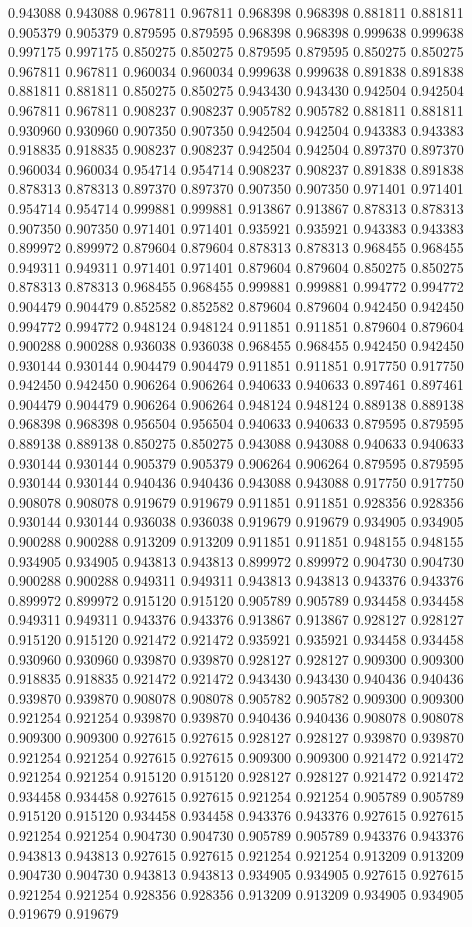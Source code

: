 0.943088 0.943088 0.967811 0.967811 0.968398 0.968398 0.881811 0.881811 0.905379 0.905379 0.879595 0.879595 0.968398 0.968398 0.999638 0.999638 0.997175 0.997175 0.850275 0.850275 0.879595 0.879595 0.850275 0.850275 0.967811 0.967811 0.960034 0.960034 0.999638 0.999638 0.891838 0.891838 0.881811 0.881811 0.850275 0.850275 0.943430 0.943430 0.942504 0.942504 0.967811 0.967811 0.908237 0.908237 0.905782 0.905782 0.881811 0.881811 0.930960 0.930960 0.907350 0.907350 0.942504 0.942504 0.943383 0.943383 0.918835 0.918835 0.908237 0.908237 0.942504 0.942504 0.897370 0.897370 0.960034 0.960034 0.954714 0.954714 0.908237 0.908237 0.891838 0.891838 0.878313 0.878313 0.897370 0.897370 0.907350 0.907350 0.971401 0.971401 0.954714 0.954714 0.999881 0.999881 0.913867 0.913867 0.878313 0.878313 0.907350 0.907350 0.971401 0.971401 0.935921 0.935921 0.943383 0.943383 0.899972 0.899972 0.879604 0.879604 0.878313 0.878313 0.968455 0.968455 0.949311 0.949311 0.971401 0.971401 0.879604 0.879604 0.850275 0.850275 0.878313 0.878313 0.968455 0.968455 0.999881 0.999881 0.994772 0.994772 0.904479 0.904479 0.852582 0.852582 0.879604 0.879604 0.942450 0.942450 0.994772 0.994772 0.948124 0.948124 0.911851 0.911851 0.879604 0.879604 0.900288 0.900288 0.936038 0.936038 0.968455 0.968455 0.942450 0.942450 0.930144 0.930144 0.904479 0.904479 0.911851 0.911851 0.917750 0.917750 0.942450 0.942450 0.906264 0.906264 0.940633 0.940633 0.897461 0.897461 0.904479 0.904479 0.906264 0.906264 0.948124 0.948124 0.889138 0.889138 0.968398 0.968398 0.956504 0.956504 0.940633 0.940633 0.879595 0.879595 0.889138 0.889138 0.850275 0.850275 0.943088 0.943088 0.940633 0.940633 0.930144 0.930144 0.905379 0.905379 0.906264 0.906264 0.879595 0.879595 0.930144 0.930144 0.940436 0.940436 0.943088 0.943088 0.917750 0.917750 0.908078 0.908078 0.919679 0.919679 0.911851 0.911851 0.928356 0.928356 0.930144 0.930144 0.936038 0.936038 0.919679 0.919679 0.934905 0.934905 0.900288 0.900288 0.913209 0.913209 0.911851 0.911851 0.948155 0.948155 0.934905 0.934905 0.943813 0.943813 0.899972 0.899972 0.904730 0.904730 0.900288 0.900288 0.949311 0.949311 0.943813 0.943813 0.943376 0.943376 0.899972 0.899972 0.915120 0.915120 0.905789 0.905789 0.934458 0.934458 0.949311 0.949311 0.943376 0.943376 0.913867 0.913867 0.928127 0.928127 0.915120 0.915120 0.921472 0.921472 0.935921 0.935921 0.934458 0.934458 0.930960 0.930960 0.939870 0.939870 0.928127 0.928127 0.909300 0.909300 0.918835 0.918835 0.921472 0.921472 0.943430 0.943430 0.940436 0.940436 0.939870 0.939870 0.908078 0.908078 0.905782 0.905782 0.909300 0.909300 0.921254 0.921254 0.939870 0.939870 0.940436 0.940436 0.908078 0.908078 0.909300 0.909300 0.927615 0.927615 0.928127 0.928127 0.939870 0.939870 0.921254 0.921254 0.927615 0.927615 0.909300 0.909300 0.921472 0.921472 0.921254 0.921254 0.915120 0.915120 0.928127 0.928127 0.921472 0.921472 0.934458 0.934458 0.927615 0.927615 0.921254 0.921254 0.905789 0.905789 0.915120 0.915120 0.934458 0.934458 0.943376 0.943376 0.927615 0.927615 0.921254 0.921254 0.904730 0.904730 0.905789 0.905789 0.943376 0.943376 0.943813 0.943813 0.927615 0.927615 0.921254 0.921254 0.913209 0.913209 0.904730 0.904730 0.943813 0.943813 0.934905 0.934905 0.927615 0.927615 0.921254 0.921254 0.928356 0.928356 0.913209 0.913209 0.934905 0.934905 0.919679 0.919679 